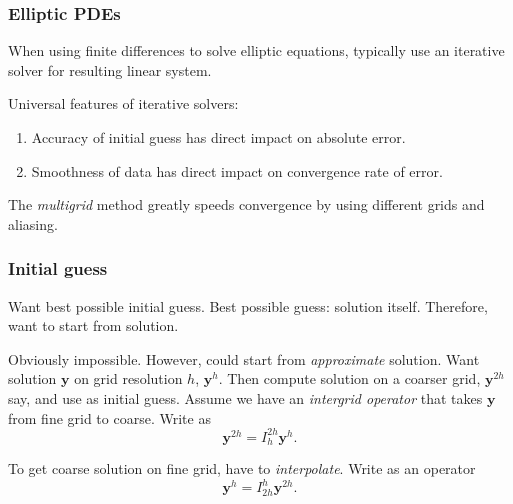\documentclass{beamer}
\newcommand{\by}{{\boldsymbol{y}}}
\begin{document}
\begin{frame}
  \frametitle{Elliptic PDEs}

  When using finite differences to solve elliptic equations, typically
  use an iterative solver for resulting linear system. \pause

  \vspace{1ex}

  Universal features of iterative solvers: \pause
  \begin{enumerate}
  \item Accuracy of initial guess has direct impact on
    absolute error. \pause
  \item Smoothness of data has direct impact on convergence rate of
    error.
  \end{enumerate} \pause

  \vspace{1ex}

  The \emph{multigrid} method greatly speeds convergence by using
  different grids and aliasing.

\end{frame}

\begin{frame}
  \frametitle{Initial guess}

  Want best possible initial guess. Best possible guess: solution
  itself. Therefore, want to start from solution. \pause

  \vspace{1ex}

  Obviously impossible. However, could start from \emph{approximate}
  solution. \pause Want solution $\by$ on grid resolution $h$,
  $\by^h$. Then compute solution on a coarser grid, $\by^{2 h}$ say,
  and use as initial guess. \pause Assume we have an \emph{intergrid
    operator} that takes $\by$ from fine grid to coarse. Write as
  \begin{equation*}
    \by^{2 h} = I^{2 h}_{h} \by^{h}.
  \end{equation*}\pause

  \vspace{1ex}

  To get coarse solution on fine grid, have to
  \emph{interpolate}. \pause Write as an operator
  \begin{equation*}
    \by^{h} = I^{h}_{2 h} \by^{2 h}.
  \end{equation*}

\end{frame}
\end{document}
